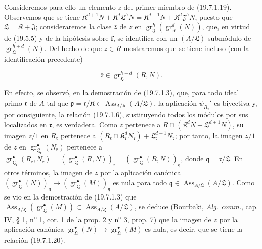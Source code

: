 Consideremos para ello un elemento $z$ del primer miembro de (19.7.1.19). Observemos que se tiene $\mathfrak K^{d+1}N+\mathfrak K^d\mathfrak L^hN=\mathfrak K^{d+1}N+\mathfrak K^d\mathfrak J^hN$, puesto que $\mathfrak L=\mathfrak K+\mathfrak J$; consideraremos la clase $\bar z$ de $z$ en $\operatorname{gr}_{\mathfrak J}^h(\operatorname{gr}_{\mathfrak K}^d(N))$, que, en virtud de (19.5.5) y de la hipótesis sobre $\mathbf f$, se identifica con un $(A/\mathfrak L)$-submódulo de $\operatorname{gr}_{\mathfrak L}^{h+d}(N)$. Del hecho de que $z\in R$ mostraremos que se tiene incluso (con la identificación precedente)
\begin{env}[19.7.1.20]
\label{IV.19.7.1.20}
\[
  \bar z\in\operatorname{gr}_{\mathfrak L}^{h+d}(R,N).
\]
\end{env}

En efecto, se observó, en la demostración de (19.7.1.3), que, para todo ideal primo $\mathfrak r$ de $A$ tal que $\mathfrak p=\mathfrak r/\mathfrak K\in\operatorname{Ass}_{A/\mathfrak K}(A/\mathfrak L)$, la aplicación $\psi_{R_{\mathfrak r}}'$ es biyectiva y, por consiguiente, la relación (19.7.1.6), sustituyendo todos los módulos por sus localizados en $\mathfrak r$, es verdadera. Como $z$ pertenece a $R\cap(\mathfrak K^dN+\mathfrak L^{d+1}N)$, su imagen $z/1$ en $R_{\mathfrak r}$ pertenece a $(R_{\mathfrak r}\cap\mathfrak K_{\mathfrak r}^dN_{\mathfrak r})+\mathfrak L_{\mathfrak r}^{d+1}N_{\mathfrak r}$; por tanto, la imagen $\bar z/1$ de $\bar z$ en $\operatorname{gr}_{\mathfrak L_{\mathfrak r}}^\bullet(N_{\mathfrak r})$ pertenece a
$\operatorname{gr}_{\mathfrak L_{\mathfrak r}}^\bullet(R_{\mathfrak r},N_{\mathfrak r})=(\operatorname{gr}_{\mathfrak L}^\bullet(R,N))_{\mathfrak r}=(\operatorname{gr}_{\mathfrak L}^\bullet(R,N))_{\mathfrak q}$,
donde $\mathfrak q=\mathfrak r/\mathfrak L$. En otros términos, la imagen de $\bar z$ por la aplicación canónica
$(\operatorname{gr}_{\mathfrak L}^\bullet(N))_{\mathfrak q}\longrightarrow(\operatorname{gr}_{\mathfrak L}^\bullet(M))_{\mathfrak q}$
es nula para todo $\mathfrak q\in\operatorname{Ass}_{A/\mathfrak L}(A/\mathfrak L)$. Como se vio en la demostración de (19.7.1.3) que
$\operatorname{Ass}_{A/\mathfrak L}(\operatorname{gr}_{\mathfrak L}^\bullet(M))\subset\operatorname{Ass}_{A/\mathfrak L}(A/\mathfrak L)$,
se deduce (Bourbaki, \emph{Alg. comm.}, cap. IV, § 1, n\textsuperscript{o} 1, cor. 1 de la prop. 2 y n\textsuperscript{o} 3, prop. 7) que la imagen de $\bar z$ por la aplicación canónica $\operatorname{gr}_{\mathfrak L}^\bullet(N)\to\operatorname{gr}_{\mathfrak L}^\bullet(M)$ es nula, es decir, que se tiene la relación (19.7.1.20).

